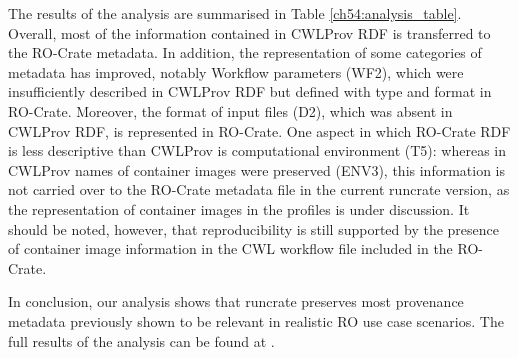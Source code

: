 The results of the analysis are summarised in Table
\vref{ch54:analysis_table}.
Overall, most of the information contained in CWLProv RDF is transferred to the RO-Crate metadata.
In addition, the representation of some categories of metadata has improved, notably Workflow parameters (WF2), which were insufficiently described in CWLProv RDF but defined with type and format in RO-Crate.
Moreover, the format of input files (D2), which was absent in CWLProv RDF, is represented in RO-Crate.
One aspect in which RO-Crate RDF is less descriptive than CWLProv is computational environment (T5): whereas in CWLProv names of container images were preserved (ENV3), this information is not carried over to the RO-Crate metadata file in the current runcrate version, as the representation of container images in the profiles is under discussion.
It should be noted, however, that reproducibility is still supported by the presence of container image information in the CWL workflow file included in the RO-Crate.

In conclusion, our analysis shows that runcrate preserves most provenance metadata previously shown to be relevant in realistic RO use case scenarios.
The full results of the analysis can be found at .


